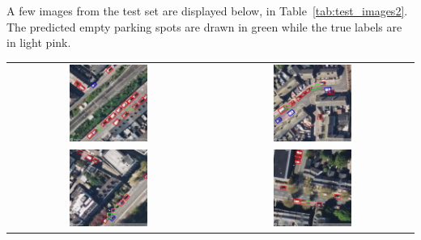 A few images from the test set are displayed below, in Table~\ref{tab:test_images2}.
The predicted empty parking spots are drawn in green while the true labels are in light pink.

\begin{table}[htbp]
  \centering
  \begin{tabular}{cc}
    \includegraphics[width=0.4\textwidth]{images/image1_empty_parking_detection_test_set.png} & \includegraphics[width=0.4\textwidth]{images/image2_empty_parking_detection_test_set.png} \\
    \includegraphics[width=0.4\textwidth]{images/image3_empty_parking_detection_test_set.png} & \includegraphics[width=0.4\textwidth]{images/image4_empty_parking_detection_test_set.png} \\

\end{tabular}
\end{table}
